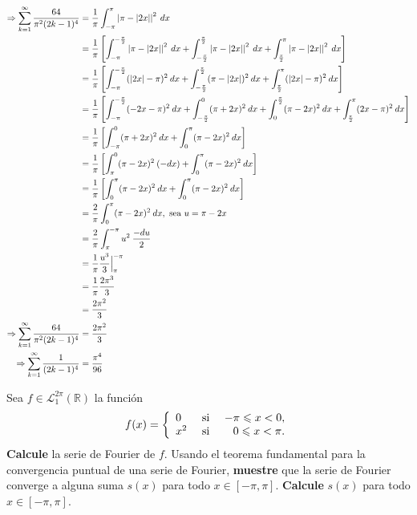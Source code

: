 \documentclass[12pt]{report}
\newcounter{it}
\theoremstyle{largebreak}
\renewcommand{\leq}{\ensuremath{\leqslant}}
\newcommand\abs[1]{\ensuremath{\left|#1\right|}}
\begin{document}
\begin{sol}
\begin{equation*}
\begin{split}
                \Rightarrow \sum_{ k=1}^\infty\frac{64}{\pi^2(2k-1)^4}&=\frac{1}{\pi}\int_{-\pi}^\pi\abs{\pi-\abs{2x}}^2\:dx\\
                &=\frac{1}{\pi}\left[\int_{-\pi}^{-\frac{\pi}{2}}\abs{\pi-\abs{2x}}^2\:dx +\int_{-\frac{\pi}{2}}^{\frac{\pi}{2}}\abs{\pi-\abs{2x}}^2\:dx+\int_{\frac{\pi}{2}}^{\pi}\abs{\pi-\abs{2x}}^2\:dx \right]\\
                &=\frac{1}{\pi}\left[\int_{-\pi}^{-\frac{\pi}{2}}(\abs{2x}-\pi)^2\:dx +\int_{-\frac{\pi}{2}}^{\frac{\pi}{2}}(\pi-\abs{2x})^2\:dx+\int_{\frac{\pi}{2}}^{\pi}(\abs{2x}-\pi)^2\:dx \right]\\
                &=\frac{1}{\pi}\left[\int_{-\pi}^{-\frac{\pi}{2}}(-2x-\pi)^2\:dx+\int_{-\frac{\pi}{2}}^{0}(\pi+2x)^2\:dx+\int_{0}^{\frac{\pi}{2}}(\pi-2x)^2\:dx+\int_{\frac{\pi}{2}}^{\pi}(2x-\pi)^2\:dx \right]\\
                &=\frac{1}{\pi}\left[\int_{-\pi}^{0}(\pi+2x)^2\:dx+\int_{0}^{\pi}(\pi-2x)^2\:dx \right]\\
                &=\frac{1}{\pi}\left[\int_{\pi}^{0}(\pi-2x)^2\:(-dx)+\int_{0}^{\pi}(\pi-2x)^2\:dx \right]\\
                &=\frac{1}{\pi}\left[\int_{0}^{\pi}(\pi-2x)^2\:dx+\int_{0}^{\pi}(\pi-2x)^2\:dx \right]\\
                &=\frac{2}{\pi}\int_{0}^{\pi}(\pi-2x)^2\:dx,\textup{ sea }u=\pi-2x \\
                &=\frac{2}{\pi}\int_{\pi}^{-\pi}u^2\:\frac{-du}{2}\\
                &=\frac{1}{\pi}\frac{u^3}{3}\Big|_{\pi}^{-\pi}\\
                &=\frac{1}{\pi}\frac{2\pi^3}{3}\\
                &=\frac{2\pi^2}{3}\\
                \Rightarrow \sum_{ k=1}^\infty\frac{64}{\pi^2(2k-1)^4}&=\frac{2\pi^2}{3}\\
                \Rightarrow \sum_{ k=1}^\infty\frac{1}{(2k-1)^4}&=\frac{\pi^4}{96}\\
            \end{split}
        \end{equation*}
    \end{sol}

    \begin{excer}
        Sea $f\in\mathcal{L}_1^{2\pi}(\mathbb{R})$ la función
        \begin{equation*}
            f(x)=\left\{ 
                \begin{array}{lcr}
                    0 & \textup{ si } & -\pi\leq x<0,\\
                    x^2 & \textup{ si } & 0\leq x<\pi.\\
                \end{array}
            \right.
        \end{equation*}
        \textbf{Calcule} la serie de Fourier de $f$. Usando el teorema fundamental para la convergencia puntual de una serie de Fourier, \textbf{muestre} que la serie de Fourier converge a alguna suma $s(x)$ para todo $x\in[-\pi,\pi]$. \textbf{Calcule} $s(x)$ para todo $x\in[-\pi,\pi]$.
    \end{excer}
\end{document}
